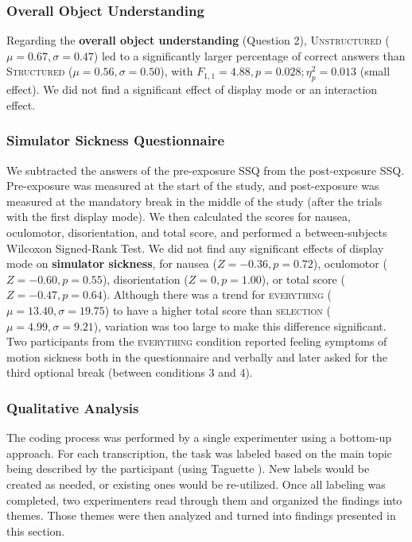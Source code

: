 \subsubsection{Overall Object Understanding}
Regarding the \textbf{overall object understanding} (Question 2), \textsc{Unstructured} ($\mu=0.67, \sigma=0.47$) led to a significantly larger percentage of correct answers than \textsc{Structured} ($\mu=0.56, \sigma=0.50$), with $F_{1,1}=4.88, p=0.028; \eta_p^2=0.013$ (small effect). We did not find a significant effect of display mode or an interaction effect.

\subsubsection{Simulator Sickness Questionnaire}
We subtracted the answers of the pre-exposure SSQ from the post-exposure SSQ. Pre-exposure was measured at the start of the study, and post-exposure was measured at the mandatory break in the middle of the study (after the trials with the first display mode). We then calculated the scores for nausea, oculomotor, disorientation, and total score, and performed a between-subjects Wilcoxon Signed-Rank Test. We did not find any significant effects of display mode on \textbf{simulator sickness}, for nausea ($Z=-0.36, p=0.72$), oculomotor ($Z=-0.60, p=0.55$), disorientation ($Z=0, p=1.00$), or total score ($Z=-0.47, p=0.64$). Although there was a trend for \textsc{everything} ($\mu=13.40, \sigma=19.75$) to have a higher total score than \textsc{selection} ($\mu=4.99, \sigma=9.21$), variation was too large to make this difference significant. Two participants from the \textsc{everything} condition reported feeling symptoms of motion sickness both in the questionnaire and verbally and later asked for the third optional break (between conditions 3 and 4).

\subsubsection{Qualitative Analysis}
The coding process was performed by a single experimenter using a bottom-up approach. For each transcription, the task was labeled based on the main topic being described by the participant (using Taguette \cite{rampin_taguette_2021}). New labels would be created as needed, or existing ones would be re-utilized. Once all labeling was completed, two experimenters read through them and organized the findings into themes. Those themes were then analyzed and turned into findings presented in this section. 

